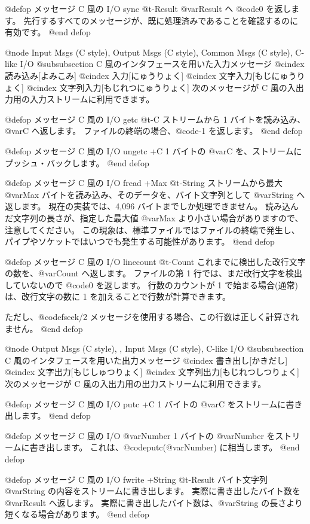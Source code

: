 {{{{@defop {メッセージ} {C 風の I/O }  sync @t{-}Result
@var{Result} へ @code{0} を返します。
先行するすべてのメッセージが、既に処理済みであることを確認するのに有効です。
@end defop

@node Input Msgs (C style), Output Msgs (C style), Common Msgs (C style), C-like I/O
@subsubsection C 風のインタフェースを用いた入力メッセージ
@cindex 読み込み[よみこみ]
@cindex 入力[にゅうりょく]
@cindex 文字入力[もじにゅうりょく]
@cindex 文字列入力[もじれつにゅうりょく]
次のメッセージが C 風の入出力用の入力ストリームに利用できます。

@defop {メッセージ} {C 風の I/O }  getc @t{-}C
ストリームから 1 バイトを読み込み、@var{C} へ返します。
ファイルの終端の場合、@code{-1} を返します。
@end defop

@defop {メッセージ} {C 風の I/O }  ungetc +C
 1 バイトの @var{C} を、ストリームにプッシュ・バックします。
@end defop

@defop {メッセージ} {C 風の I/O }  fread +Max @t{-}String
ストリームから最大 @var{Max} バイトを読み込み、そのデータを、バイト文字列として @var{String} へ返します。
現在の実装では、4,096 バイトまでしか処理できません。
読み込んだ文字列の長さが、指定した最大値 @var{Max} より小さい場合がありますので、注意してください。
この現象は、標準ファイルではファイルの終端で発生し、パイプやソケットではいつでも発生する可能性があります。
@end defop  

@defop {メッセージ} {C 風の I/O }  linecount @t{-}Count
これまでに検出した改行文字の数を、@var{Count} へ返します。
ファイルの第 1 行では、まだ改行文字を検出していないので @code{0} を返します。
行数のカウントが 1 で始まる場合(通常)は、改行文字の数に 1 を加えることで行数が計算できます。

ただし、@code{fseek/2} メッセージを使用する場合、この行数は正しく計算されません。
@end defop 

@node Output Msgs (C style),  , Input Msgs (C style), C-like I/O
@subsubsection C 風のインタフェースを用いた出力メッセージ
@cindex 書き出し[かきだし]
@cindex 文字出力[もじしゅつりょく]
@cindex 文字列出力[もじれつしつりょく]
次のメッセージが C 風の入出力用の出力ストリームに利用できます。

@defop {メッセージ} {C 風の I/O }  putc +C
 1 バイトの @var{C} をストリームに書き出します。
@end defop

@defop {メッセージ} {C 風の I/O }  @var{Number}
 1 バイトの @var{Number} をストリームに書き出します。
これは、@code{putc(@var{Number})} に相当します。
@end defop

@defop {メッセージ} {C 風の I/O }  fwrite +String @t{-}Result
バイト文字列 @var{String} の内容をストリームに書き出します。
実際に書き出したバイト数を @var{Result} へ返します。
実際に書き出したバイト数は、@var{String} の長さより短くなる場合があります。
@end defop

}}}}
